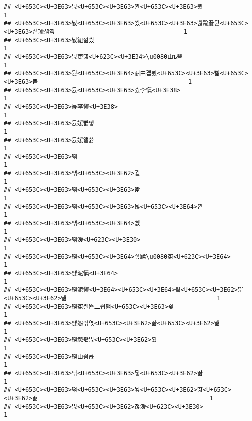 \documentclass[]{article}
\begin{document}
\begin{verbatim}
## <U+653C><U+3E63>닔<U+653C><U+3E63>꽌<U+653C><U+3E63>뿭                                                      1
## <U+653C><U+3E63>닔<U+653C><U+3E63>쑀<U+653C><U+3E63>뿭踰꾩뒪<U+653C><U+3E63>젙瑜섏옣                                    1
## <U+653C><U+3E63>닔紐낆씠                                                            1
## <U+653C><U+3E63>닔吏덇<U+623C><U+3E34>\u0080由ъ뿉                                              1
## <U+653C><U+3E63>뒪<U+653C><U+3E64>겕由곕룄<U+653C><U+3E63>뼱<U+653C><U+3E63>뿉                                          1
## <U+653C><U+3E63>듅<U+653C><U+3E63>슜李愼<U+3E38>                                                      1
## <U+653C><U+3E63>듅李愼<U+3E38>                                                            1
## <U+653C><U+3E63>듅媛뺤옣                                                            1
## <U+653C><U+3E63>듅媛앹쓣                                                            1
## <U+653C><U+3E63>떆                                                                  1
## <U+653C><U+3E63>떆<U+653C><U+3E62>궡                                                            1
## <U+653C><U+3E63>떆<U+653C><U+3E63>꽕                                                            1
## <U+653C><U+3E63>떆<U+653C><U+3E63>뒪<U+653C><U+3E64>뀥                                                      1
## <U+653C><U+3E63>떆<U+653C><U+3E64>뻾                                                            1
## <U+653C><U+3E63>떆湲<U+623C><U+3E30>                                                            1
## <U+653C><U+3E63>떊<U+653C><U+3E64>샇蹂\u0080寃<U+623C><U+3E64>                                              1
## <U+653C><U+3E63>떊泥愼<U+3E64>                                                            1
## <U+653C><U+3E63>떊泥愼<U+3E64><U+653C><U+3E64>빀<U+653C><U+3E62>땲<U+653C><U+3E62>떎                                          1
## <U+653C><U+3E63>떊寃쎌뜥二쇱꽭<U+653C><U+3E63>슂                                                1
## <U+653C><U+3E63>떊怨좎엯<U+653C><U+3E62>땲<U+653C><U+3E62>떎                                                1
## <U+653C><U+3E63>떊怨좏빐<U+653C><U+3E62>룄                                                      1
## <U+653C><U+3E63>떊由쇰룞                                                            1
## <U+653C><U+3E63>떢<U+653C><U+3E63>뒿<U+653C><U+3E62>땲                                                      1
## <U+653C><U+3E63>떢<U+653C><U+3E63>뒿<U+653C><U+3E62>땲<U+653C><U+3E62>떎                                                1
## <U+653C><U+3E63>벐<U+653C><U+3E62>젅湲<U+623C><U+3E30>                                                      1

\end{verbatim}
\end{document}
